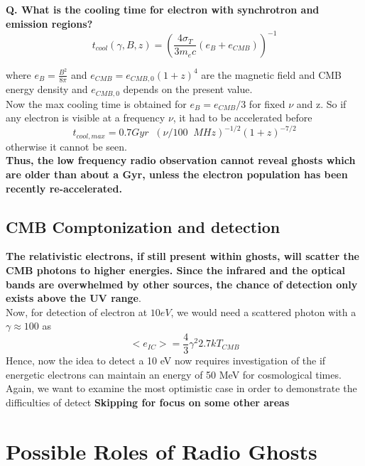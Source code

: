 \documentclass[11pt]{report}
\newcommand{\tbf}[1]{\textbf{#1}}
\newcommand{\cc}[1]{\left({#1}\right)}
\begin{document}
\tbf{Q. What is the cooling time for electron with synchrotron and emission regions?}\\

\begin{equation}
t_{cool}(\gamma,B,z)=\cc{\frac{4 \sigma_T}{3 m_ec}(e_B+e_{CMB})}^{-1}
\end{equation}

where $e_B=\frac{B^2}{8 \pi}$ and $e_{CMB}=e_{CMB,0}(1+z)^4$ are the magnetic field and CMB energy density and $e_{CMB,0}$ depends on the present value. \\

Now the max cooling time is obtained for $e_B=e_{CMB}/3$ for fixed $\nu$ and z. So if any electron is visible at a frequency $\nu$, it had to be accelerated before 
\begin{equation}
t_{cool,max}=0.7Gyr\;\;\cc{\nu/100\;\;MHz}^{-1/2}(1+z)^{-7/2}
\end{equation} 
otherwise it cannot be seen.\\

\tbf{Thus, the low frequency radio observation cannot reveal ghosts which are older than about a Gyr, unless the electron population has been recently re-accelerated.}

\subsection{CMB Comptonization and detection}
\tbf{The relativistic electrons, if still present within ghosts, will scatter the CMB photons to higher energies. Since the infrared and the optical bands are overwhelmed by other sources, the chance of detection only exists above the UV range}.\\


Now, for detection of electron at $10eV$, we would need a scattered photon with a $\gamma\approx 100$ as
\begin{equation}
<e_{IC}>=\frac{4}{3}\gamma^2 2.7 kT_{CMB}
\end{equation}
Hence, now the idea to detect a 10 eV now requires investigation of the if  energetic electrons can maintain an energy of 50 MeV for cosmological times. \\

Again, we want to examine the most optimistic case in order to demonstrate the difficulties of detect
\tbf{Skipping for focus on some other areas}\\

\section{Possible Roles of Radio Ghosts}
\end{document}
